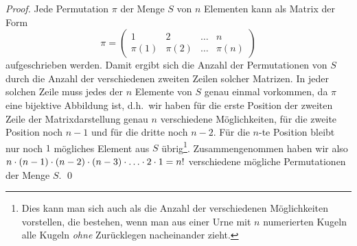 \begin{proof}
Jede Permutation $\pi$ der Menge $S$ von $n$ Elementen kann als Matrix
der Form
\begin{displaymath}
\pi = \left( 
\begin{array}{cccc}
1 & 2 & \dots & n\\
\pi(1) & \pi(2) & \dots & \pi(n)
\end{array}
\right)
\end{displaymath}
aufgeschrieben werden. Damit ergibt sich die Anzahl der Permutationen
von $S$ durch die Anzahl der verschiedenen zweiten Zeilen solcher
Matrizen. In jeder solchen Zeile muss jedes der $n$ Elemente von $S$
genau einmal vorkommen, da $\pi$ eine bijektive Abbildung ist,
d.h.~wir haben für die erste Position der zweiten Zeile der
Matrixdarstellung genau $n$ verschiedene Möglichkeiten, für die zweite
Position noch $n - 1$ und für die dritte noch $n-2$. Für die $n$-te
Position bleibt nur noch $1$ mögliches Element aus $S$
übrig\footnote{Dies kann man sich auch als die Anzahl der
verschiedenen Möglichkeiten vorstellen, die bestehen, wenn man aus
einer Urne mit $n$ numerierten Kugeln alle Kugeln \emph{ohne}
Zurücklegen nacheinander zieht.}. Zusammengenommen haben wir also
$n \cdot (n - 1) \cdot (n - 2) \cdot (n - 3) \cdot \ldots \cdot 2 \cdot
1 = n!$ verschiedene mögliche Permutationen der Menge $S$.
\qed
\end{proof}

\fi
